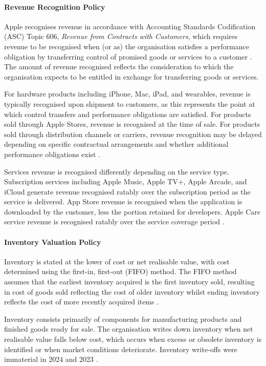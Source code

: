 \documentclass[12pt,a4paper]{article}
\begin{document}
\paragraph{Revenue Recognition Policy}

Apple recognises revenue in accordance with Accounting Standards Codification (ASC) Topic 606, \textit{Revenue from Contracts with Customers}, which requires revenue to be recognised when (or as) the organisation satisfies a performance obligation by transferring control of promised goods or services to a customer \citep{fasb2014}. The amount of revenue recognised reflects the consideration to which the organisation expects to be entitled in exchange for transferring goods or services.

For hardware products including iPhone, Mac, iPad, and wearables, revenue is typically recognised upon shipment to customers, as this represents the point at which control transfers and performance obligations are satisfied. For products sold through Apple Stores, revenue is recognised at the time of sale. For products sold through distribution channels or carriers, revenue recognition may be delayed depending on specific contractual arrangements and whether additional performance obligations exist \citep{apple202410k}.

Services revenue is recognised differently depending on the service type. Subscription services including Apple Music, Apple TV+, Apple Arcade, and iCloud generate revenue recognised ratably over the subscription period as the service is delivered. App Store revenue is recognised when the application is downloaded by the customer, less the portion retained for developers. Apple Care service revenue is recognised ratably over the service coverage period \citep{apple202410k}.

\paragraph{Inventory Valuation Policy}

Inventory is stated at the lower of cost or net realisable value, with cost determined using the first-in, first-out (FIFO) method. The FIFO method assumes that the earliest inventory acquired is the first inventory sold, resulting in cost of goods sold reflecting the cost of older inventory whilst ending inventory reflects the cost of more recently acquired items \citep{kieso2023}.

Inventory consists primarily of components for manufacturing products and finished goods ready for sale. The organisation writes down inventory when net realisable value falls below cost, which occurs when excess or obsolete inventory is identified or when market conditions deteriorate. Inventory write-offs were immaterial in 2024 and 2023 \citep{apple202410k}.
\end{document}
